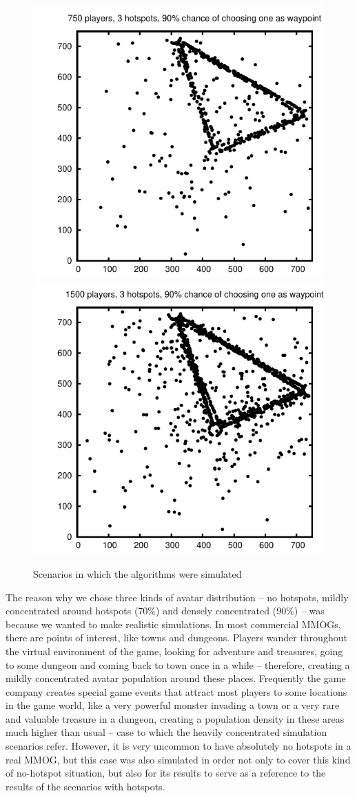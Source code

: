 \documentclass[acmjacm]{acmtrans2m}
\begin{document}
\begin{figure}
  \includegraphics[width=0.49\linewidth]{data/750players_prob90/avatarsdistribution}
  \includegraphics[width=0.49\linewidth]{data/1500players_prob90/avatarsdistribution}
  \caption{Scenarios in which the algorithms were simulated}
   \label{fig:scenarios}
\end{figure}

The reason why we chose three kinds of avatar distribution -- no hotspots, mildly concentrated around hotspots (70\%) and densely concentrated (90\%) -- was because we wanted to make realistic simulations. In most commercial MMOGs, there are points of interest, like towns and dungeons. Players wander throughout the virtual environment of the game, looking for adventure and treasures, going to some dungeon and coming back to town once in a while -- therefore, creating a mildly concentrated avatar population around these places. Frequently the game company creates special game events that attract most players to some locations in the game world, like a very powerful monster invading a town or a very rare and valuable treasure in a dungeon, creating a population density in these areas much higher than usual -- case to which the heavily concentrated simulation scenarios refer. However, it is very uncommon to have absolutely no hotspots in a real MMOG, but this case was also simulated in order not only to cover this kind of no-hotspot situation, but also for its results to serve as a reference to the results of the scenarios with hotspots.
\end{document}
